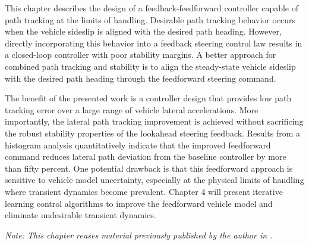 This chapter describes the design of a feedback-feedforward controller capable of path tracking at the limits of handling. Desirable
 path tracking behavior occurs when the vehicle sideslip is aligned
with the desired path heading. However, directly incorporating this behavior into a feedback steering control law results in 
a closed-loop controller with poor stability margins. 
A better approach for combined path tracking and stability is to align the steady-state vehicle sideslip 
with the desired path heading through the feedforward steering command. 

The benefit of the presented work is a controller design that provides low path tracking error over a large
range of vehicle lateral accelerations. More importantly, the lateral path tracking improvement is achieved without
sacrificing the robust stability properties of the lookahead steering feedback. Results from
a histogram analysis quantitatively indicate that the improved feedforward command reduces lateral path deviation from the baseline
controller by more than fifty percent. One potential drawback is that this feedforward approach is sensitive to vehicle model uncertainty, especially at the physical
limits of handling where transient dynamics become prevalent. Chapter 4 will present iterative learning control
algorithms to improve the feedforward vehicle model and eliminate undesirable transient dynamics. 

 \textit{Note: This chapter reuses material previously published by the author in \cite{kapania}.}

